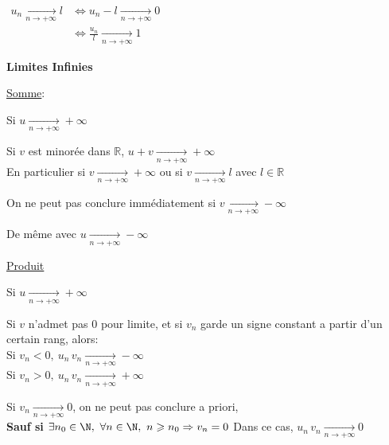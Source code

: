 \documentclass[12pt,twoside,a4paper]{article}
\begin{document}
		\begin{coro}
			$\begin{aligned}u_n\mathop{\longrightarrow}\limits_{n\rightarrow+\infty}l&\iff u_n-l\mathop{\longrightarrow}\limits_{n\rightarrow+\infty}0\\
				&\iff \frac{u_n}{l}\mathop{\longrightarrow}\limits_{n\rightarrow+\infty}1\end{aligned}$
		\end{coro}
		\begin{flushleft}
			\textbf{Limites Infinies}
		\end{flushleft}
		\begin{prop}
			\underline{Somme}:
			\begin{liste}
				\item Si $u\mathop{\longrightarrow}\limits_{n\rightarrow+\infty}+\infty$
				\begin{liste}
					\item Si $v$ est minor\'ee dans $\mathbb{R}$, $u+v\mathop{\longrightarrow}\limits_{n\rightarrow+\infty}+\infty$\\
						En particulier si $v\mathop{\longrightarrow}\limits_{n\rightarrow+\infty}+\infty$ ou si $v\mathop{\longrightarrow}\limits_{n\rightarrow+\infty}l$ avec $l\in\mathbb{R}$
					\item On ne peut pas conclure imm\'ediatement si $v\mathop{\longrightarrow}\limits_{n\rightarrow+\infty}-\infty$
				\end{liste}
				\item De m\^eme avec $u\mathop{\longrightarrow}\limits_{n\rightarrow+\infty}-\infty$
			\end{liste}
			\underline{Produit}
			\begin{liste}
				\item Si $u\mathop{\longrightarrow}\limits_{n\rightarrow+\infty}+\infty$
				\begin{liste}
					\item Si $v$ n'admet pas $0$ pour limite, et si $v_n$ garde un signe constant a partir d'un certain rang, alors:\\
						Si $v_n<0,\ u_n\,v_n\mathop{\longrightarrow}\limits_{n\rightarrow+\infty}-\infty$\\
						Si $v_n>0,\ u_n\,v_n\mathop{\longrightarrow}\limits_{n\rightarrow+\infty}+\infty$
					\item Si $v_n\mathop{\longrightarrow}\limits_{n\rightarrow+\infty}0$, on ne peut pas conclure a priori,\\
					\textbf{Sauf si} $\exists n_0\in\N,\ \forall n\in\N,\ n\geqslant n_0\Rightarrow v_n=0$ Dans ce cas, $u_n\,v_n\mathop{\longrightarrow}\limits_{n\rightarrow+\infty}0$

\end{liste}
\end{liste}
\end{prop}
\end{document}
